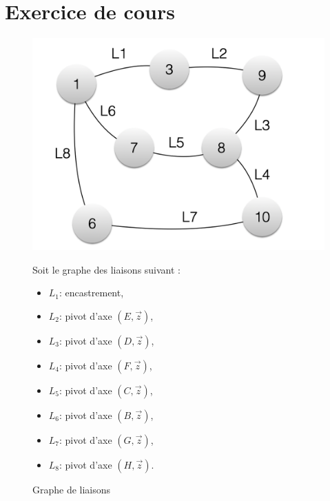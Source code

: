 

\section{Exercice de cours}



\begin{figure}[ht!]
\begin{minipage}{0.5\linewidth}
\includegraphics[width=.8\linewidth]{img/graphe_liaison.png}
\caption{\label{graphe_liaison}Graphe de liaisons}
\end{minipage}
\begin{minipage}{0.5\linewidth}
Soit le graphe des liaisons suivant :
\begin{itemize}
 \item $L_1$: encastrement,
 \item $L_2$: pivot d’axe $(E, \overrightarrow{z})$,
 \item $L_3$: pivot d’axe $(D, \overrightarrow{z})$,
 \item $L_4$: pivot d’axe $(F, \overrightarrow{z})$,
 \item $L_5$: pivot d’axe $(C, \overrightarrow{z})$,
 \item $L_6$: pivot d’axe $(B, \overrightarrow{z})$,
 \item $L_7$: pivot d’axe $(G, \overrightarrow{z})$,
 \item $L_8$: pivot d’axe $(H, \overrightarrow{z})$.
\end{itemize}
\end{minipage}
\end{figure}

